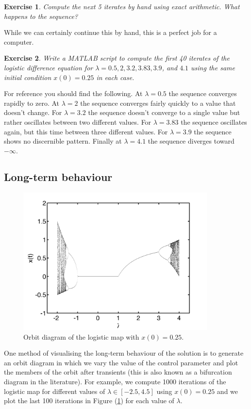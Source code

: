 \documentclass{tufte-handout}
\newtheorem{del}{Exercise}
\begin{document}
\begin{del}
Compute the next 5 iterates by hand using exact arithmetic. What happens to the sequence?
\end{del}

While we can certainly continue this by hand, this is a perfect job for a computer.

\begin{del}
Write a MATLAB script to compute the first 40 iterates of the logistic difference equation for $\lambda = 0.5, 2, 3.2, 3.83, 3.9$, and $4.1$ using the same initial condition $x(0) = 0.25$ in each case.
\end{del}

For reference you should find the following. At $\lambda = 0.5$ the sequence converges rapidly to zero. At $\lambda=2$ the sequence converges fairly quickly to a value that doesn't change. For $\lambda=3.2$ the sequence doesn't converge to a single value but rather oscillates between two different values. For $\lambda=3.83$ the sequence oscillates again, but this time between three different values. For $\lambda=3.9$ the sequence shows no discernible pattern. Finally at $\lambda = 4.1$ the sequence diverges toward $- \infty$.

\subsection*{Long-term behaviour}

\begin{figure}[h]
\centering
\includegraphics[width=10cm]{figs/logistic_orbit}
\caption{Orbit diagram of the logistic map with $x(0) = 0.25$.}
\label{figure.logistic_orbit}
\end{figure}

One method of visualising the long-term behaviour of the solution is to generate an orbit diagram in which we vary the value of the control parameter and plot the members of the orbit after transients (this is also known as a bifurcation diagram in the literature).  For example, we compute 1000 iterations of the logistic map for different values of $\lambda \in [-2.5,4.5]$ using $x(0) = 0.25$ and we plot the last 100 iterations in Figure (\ref{figure.logistic_orbit}) for each value of $\lambda$. 
\end{document}
